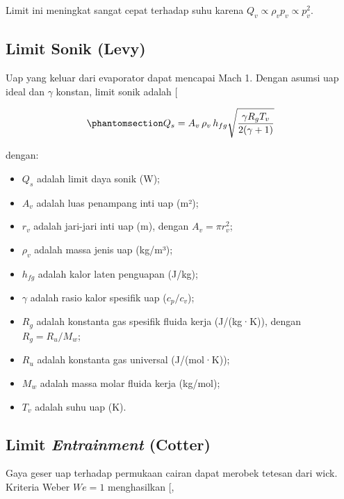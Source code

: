 \documentclass[
  indonesian,
  12pt,
  a4paper,
]{report}
\providecommand{\tightlist}{%
  \setlength{\itemsep}{0pt}\setlength{\parskip}{0pt}}
\begin{document}
Limit ini meningkat sangat cepat terhadap suhu karena
\(Q_v \propto \rho_v p_v \propto p_v^2\).

\subsection{Limit Sonik (Levy)}\label{limit-sonik-levy}

Uap yang keluar dari evaporator dapat mencapai Mach 1. Dengan asumsi uap
ideal dan \(\gamma\) konstan, limit sonik adalah
{[}\citeproc{ref-levy1968}{29}{]}

\begin{equation}\protect\phantomsection\label{eq-sonic}{ Q_s = A_v\,\rho_v\,h_{fg}
   \sqrt{\frac{\gamma R_g T_v}{2(\gamma+1)}} }\end{equation}

dengan:

\begin{itemize}
\tightlist
\item
  \(Q_s\) adalah limit daya sonik (W);
\item
  \(A_v\) adalah luas penampang inti uap (m²);
\item
  \(r_v\) adalah jari-jari inti uap (m), dengan \(A_v=\pi r_v^2\);
\item
  \(\rho_v\) adalah massa jenis uap (kg/m³);
\item
  \(h_{fg}\) adalah kalor laten penguapan (J/kg);
\item
  \(\gamma\) adalah rasio kalor spesifik uap (\(c_p/c_v\));
\item
  \(R_g\) adalah konstanta gas spesifik fluida kerja (J/(kg·K)), dengan
  \(R_g=R_u/M_w\);
\item
  \(R_u\) adalah konstanta gas universal (J/(mol·K));
\item
  \(M_w\) adalah massa molar fluida kerja (kg/mol);
\item
  \(T_v\) adalah suhu uap (K).
\end{itemize}

\subsection{\texorpdfstring{Limit \emph{Entrainment}
(Cotter)}{Limit Entrainment (Cotter)}}\label{limit-entrainment-cotter}

Gaya geser uap terhadap permukaan cairan dapat merobek tetesan dari
wick. Kriteria Weber \(We=1\) menghasilkan
{[}, \citeproc{ref-tien1979}{14}{]}
\end{document}
